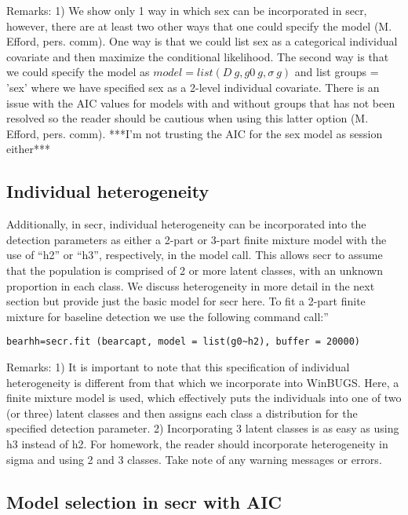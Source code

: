 Remarks: 1) We show only 1 way in which sex can be incorporated in
secr, however, there are at least two other ways that one could
specify the model (M. Efford, pers. comm).  One way is that we could
list sex as a categorical individual covariate and then maximize the
conditional likelihood.  The second way is that we could specify the
model as $model = list(D~g, g0~g, \sigma~g)$ and list groups = 'sex'
where we have specified sex as a 2-level individual covariate.  There
is an issue with the AIC values for models with and without groups
that has not been resolved so the reader should be cautious when using
this latter option (M. Efford, pers. comm).  ***I'm not trusting the
AIC for the sex model as session either***

\subsection{Individual heterogeneity}

Additionally, in secr,  individual heterogeneity can be incorporated
into the detection parameters as either a 2-part or 3-part finite
mixture model with the use of ``h2'' or ``h3'', respectively, in the
model call.    This allows secr to assume that the population is
comprised of 2 or more latent classes, with an unknown proportion in
each class.  We discuss heterogeneity in more detail in the next
section but provide just the basic model for secr here.  To fit a
2-part finite mixture for baseline detection we use the following
command call:''

\begin{verbatim} 
bearhh=secr.fit (bearcapt, model = list(g0~h2), buffer = 20000)
\end{verbatim} 

Remarks:  1) It is important to note that this specification of
individual heterogeneity is different from that which we incorporate
into WinBUGS.  Here, a finite mixture model is used, which effectively
puts the individuals into one of two (or three) latent classes and
then assigns each class a distribution for the specified detection
parameter.  2) Incorporating 3 latent classes is as easy as using h3
instead of h2.  For homework, the reader should incorporate
heterogeneity in sigma and using 2 and 3 classes.   Take note of any
warning messages or errors.

\subsection{Model selection in secr with AIC}

